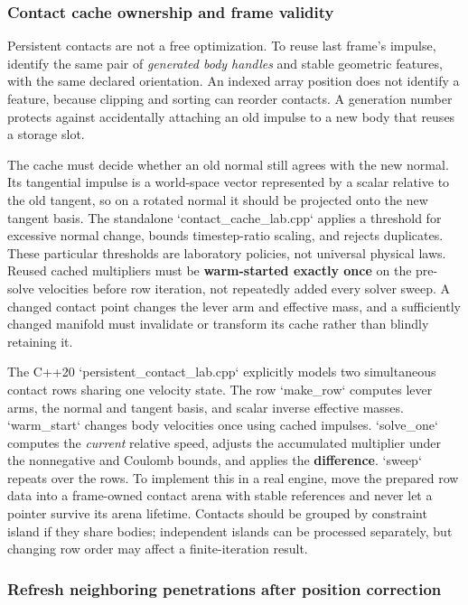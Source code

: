 \subsubsection{Contact cache ownership and frame validity}\label{06-engine-ii-ch046-contact-cache-ownership-and-frame-validity}

Persistent contacts are not a free optimization. To reuse last frame's impulse, identify the same pair of \emph{generated body handles} and stable geometric features, with the same declared orientation. An indexed array position does not identify a feature, because clipping and sorting can reorder contacts. A generation number protects against accidentally attaching an old impulse to a new body that reuses a storage slot.

The cache must decide whether an old normal still agrees with the new normal. Its tangential impulse is a world-space vector represented by a scalar relative to the old tangent, so on a rotated normal it should be projected onto the new tangent basis. The standalone `contact\_cache\_lab.cpp` applies a threshold for excessive normal change, bounds timestep-ratio scaling, and rejects duplicates. These particular thresholds are laboratory policies, not universal physical laws. Reused cached multipliers must be \textbf{warm-started exactly once} on the pre-solve velocities before row iteration, not repeatedly added every solver sweep. A changed contact point changes the lever arm and effective mass, and a sufficiently changed manifold must invalidate or transform its cache rather than blindly retaining it.

The C++20 `persistent\_contact\_lab.cpp` explicitly models two simultaneous contact rows sharing one velocity state. The row `make\_row` computes lever arms, the normal and tangent basis, and scalar inverse effective masses. `warm\_start` changes body velocities once using cached impulses. `solve\_one` computes the \emph{current} relative speed, adjusts the accumulated multiplier under the nonnegative and Coulomb bounds, and applies the \textbf{difference}. `sweep` repeats over the rows. To implement this in a real engine, move the prepared row data into a frame-owned contact arena with stable references and never let a pointer survive its arena lifetime. Contacts should be grouped by constraint island if they share bodies; independent islands can be processed separately, but changing row order may affect a finite-iteration result.

\subsubsection{Refresh neighboring penetrations after position correction}\label{06-engine-ii-ch046-refresh-neighboring-penetrations-after-position-correction}

